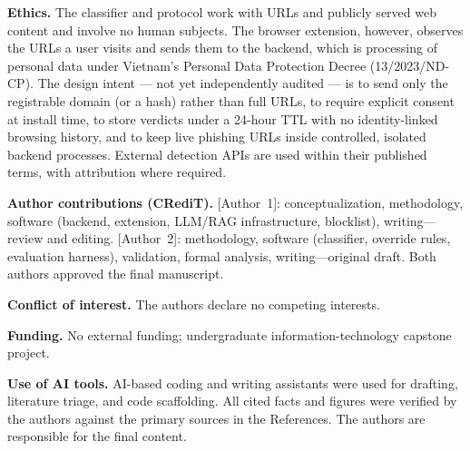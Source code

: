 \documentclass[conference]{IEEEtran}
\begin{document}
\textbf{Ethics.} The classifier and protocol work with URLs and publicly served
web content and involve no human subjects. The browser extension, however,
observes the URLs a user visits and sends them to the backend, which is
processing of personal data under Vietnam's Personal Data Protection Decree
(13/2023/ND-CP). The design intent --- not yet independently audited --- is to
send only the registrable domain (or a hash) rather than full URLs, to require
explicit consent at install time, to store verdicts under a 24-hour TTL with no
identity-linked browsing history, and to keep live phishing URLs inside
controlled, isolated backend processes. External detection APIs are used within
their published terms, with attribution where required.

\textbf{Author contributions (CRediT).} [Author~1]: conceptualization,
methodology, software (backend, extension, LLM/RAG infrastructure, blocklist),
writing---review and editing. [Author~2]: methodology, software (classifier,
override rules, evaluation harness), validation, formal analysis,
writing---original draft. Both authors approved the final manuscript.

\textbf{Conflict of interest.} The authors declare no competing interests.

\textbf{Funding.} No external funding; undergraduate information-technology
capstone project.

\textbf{Use of AI tools.} AI-based coding and writing assistants were used for
drafting, literature triage, and code scaffolding. All cited facts and figures
were verified by the authors against the primary sources in the References. The
authors are responsible for the final content.



\end{document}
